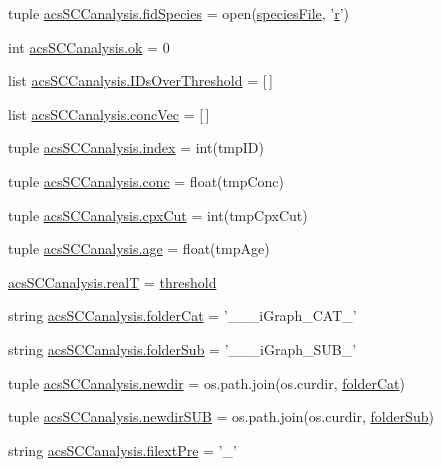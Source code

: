 \begin{DoxyCompactItemize}
\item 
tuple \hyperlink{a00102_aba2f982879776e057b35971b3653549e}{acs\-S\-C\-Canalysis.\-fid\-Species} = open(\hyperlink{a00027_a7da0c82834970c5f3c3d9224ab832577}{species\-File}, '\hyperlink{a00031_ac862e7284527eb913b1351c8bfb8e079}{r}')
\item 
int \hyperlink{a00102_a9ce833d782f17d858941cfa76914599a}{acs\-S\-C\-Canalysis.\-ok} = 0
\item 
list \hyperlink{a00102_a578f0f0f1e87579d73b11f8720610b1e}{acs\-S\-C\-Canalysis.\-I\-Ds\-Over\-Threshold} = \mbox{[}$\,$\mbox{]}
\item 
list \hyperlink{a00102_a1681853ab5f5859e51f219caa07a8539}{acs\-S\-C\-Canalysis.\-conc\-Vec} = \mbox{[}$\,$\mbox{]}
\item 
tuple \hyperlink{a00102_aaac3bb67a998c4a09aeed8f1adec2f9c}{acs\-S\-C\-Canalysis.\-index} = int(tmp\-I\-D)
\item 
tuple \hyperlink{a00102_a6ec435b19c74f79f32a0eae7bb2bd1c8}{acs\-S\-C\-Canalysis.\-conc} = float(tmp\-Conc)
\item 
tuple \hyperlink{a00102_a06673ec4592e44a89a443073b8a29011}{acs\-S\-C\-Canalysis.\-cpx\-Cut} = int(tmp\-Cpx\-Cut)
\item 
tuple \hyperlink{a00102_a98baad82b74a27e8b8c58aa985b7d374}{acs\-S\-C\-Canalysis.\-age} = float(tmp\-Age)
\item 
\hyperlink{a00102_a1c9b45f6074222ace96b7ab38cb8e23b}{acs\-S\-C\-Canalysis.\-real\-T} = \hyperlink{a00036_aa022cbb28f80299d572def08e7a5ccfd}{threshold}
\item 
string \hyperlink{a00102_a1cbfd083273176eebfe0260e8384acef}{acs\-S\-C\-Canalysis.\-folder\-Cat} = '\-\_\-\-\_\-\_\-i\-Graph\-\_\-\-C\-A\-T\-\_\-'
\item 
string \hyperlink{a00102_a90c2bcabbdb271c2c3347ebea4c259bc}{acs\-S\-C\-Canalysis.\-folder\-Sub} = '\-\_\-\-\_\-\_\-i\-Graph\-\_\-\-S\-U\-B\-\_\-'
\item 
tuple \hyperlink{a00102_a440179ca1c764cabcf9181985ae5dfb8}{acs\-S\-C\-Canalysis.\-newdir} = os.\-path.\-join(os.\-curdir, \hyperlink{a00028_ac4793cb55101110d228ded89ce9caa48}{folder\-Cat})
\item 
tuple \hyperlink{a00102_adb3b62d0896774bc87adfee19d047aa8}{acs\-S\-C\-Canalysis.\-newdir\-S\-U\-B} = os.\-path.\-join(os.\-curdir, \hyperlink{a00028_a05c5bf0305e5d58d4dc25bd89a025678}{folder\-Sub})
\item 
string \hyperlink{a00102_a60ff937c050eef601bd84134d1913d8a}{acs\-S\-C\-Canalysis.\-filext\-Pre} = '\-\_\-'
\item 

\end{DoxyCompactItemize}

